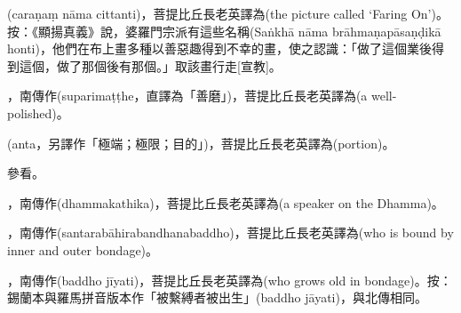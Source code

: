 \startitemgroup[noteitems]
\item{}(caraṇaṃ nāma cittanti)，菩提比丘長老英譯為(the picture called ‘Faring On’)。按：《顯揚真義》說，婆羅門宗派有這些名稱(Saṅkhā nāma brāhmaṇapāsaṇḍikā honti)，他們在布上畫多種以善惡趣得到不幸的畫，使之認識：「做了這個業後得到這個，做了那個後有那個。」取該畫行走[宣教]。
\stopitemgroup

\startitemgroup[noteitems]
\item{}，南傳作(suparimaṭṭhe，直譯為「善磨」)，菩提比丘長老英譯為(a well-polished)。
\stopitemgroup

\startitemgroup[noteitems]
\item{}(anta，另譯作「極端；極限；目的」)，菩提比丘長老英譯為(portion)。
\stopitemgroup

\startitemgroup[noteitems]
\item{}參看。
\stopitemgroup

\startitemgroup[noteitems]
\item{}，南傳作(dhammakathika)，菩提比丘長老英譯為(a speaker on the Dhamma)。
\stopitemgroup

\startitemgroup[noteitems]
\item{}，南傳作(santarabāhirabandhanabaddho)，菩提比丘長老英譯為(who is bound by inner and outer bondage)。
\stopitemgroup

\startitemgroup[noteitems]
\item{}，南傳作(baddho jīyati)，菩提比丘長老英譯為(who grows old in bondage)。按：錫蘭本與羅馬拼音版本作「被繫縛者被出生」(baddho jāyati)，與北傳相同。
\stopitemgroup

